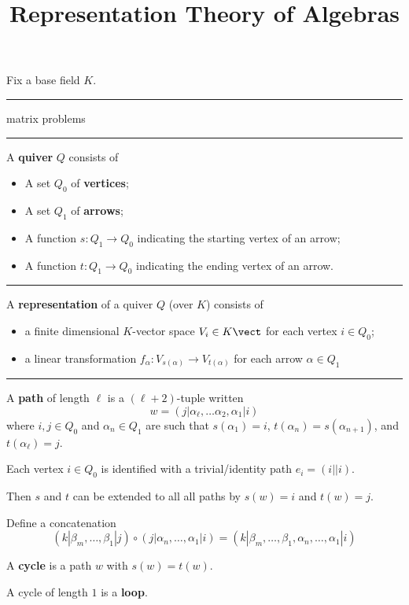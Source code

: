\documentclass[12pt]{article}
\newcommand{\keyword}[1]{\textbf{#1}}
\newcommand{\sepline}{\rule{\textwidth}{0.4pt}}
\theoremstyle{definition}
\newcommand{\<}{\langle}
\renewcommand{\>}{\rangle}
\renewcommand{\_}[1]{{_{#1}}}
\begin{document}
\title{Representation Theory of Algebras}
\author{}
\date{}

Fix a base field $K$.

\sepline

matrix problems

\sepline

A \keyword{quiver} $Q$ consists of
\begin{itemize}
    \item A set $Q_0$ of \keyword{vertices};
    \item A set $Q_1$ of \keyword{arrows};
    \item A function $s : Q_1 \to Q_0$ indicating the starting vertex of an arrow;
    \item A function $t : Q_1 \to Q_0$ indicating the ending vertex of an arrow.
\end{itemize}

\sepline

A \keyword{representation} of a quiver $Q$ (over $K$) consists of
\begin{itemize}
    \item a finite dimensional $K$-vector space $V_i \in K\vect$ for each vertex $i \in Q_0$;
    \item a linear transformation $f_\alpha : V_{s(\alpha)} \to V_{t(\alpha)}$ for each arrow $\alpha \in Q_1$
\end{itemize}

\sepline

A \keyword{path} of length $\ell$ is a $(\ell + 2)$-tuple written
\[
    w = (j | \alpha_\ell, \dots \alpha_2, \alpha_1 | i)
\]
where $i, j \in Q_0$ and $\alpha_n \in Q_1$ are such that $s(\alpha_1) = i$, $t(\alpha_n) = s(\alpha_{n+1})$, and $t(\alpha_\ell) = j$.

Each vertex $i \in Q_0$ is identified with a trivial/identity path $e_i = (i || i)$.

Then $s$ and $t$ can be extended to all all paths by $s(w) = i$ and $t(w) = j$.

Define a concatenation
\[
    (k|\beta_m, \dots, \beta_1|j) \circ (j|\alpha_n, \dots, \alpha_1|i) = (k|\beta_m, \dots, \beta_1, \alpha_n, \dots, \alpha_1|i)
\]

A \keyword{cycle} is a path $w$ with $s(w) = t(w)$.

A cycle of length $1$ is a \keyword{loop}.
\end{document}
